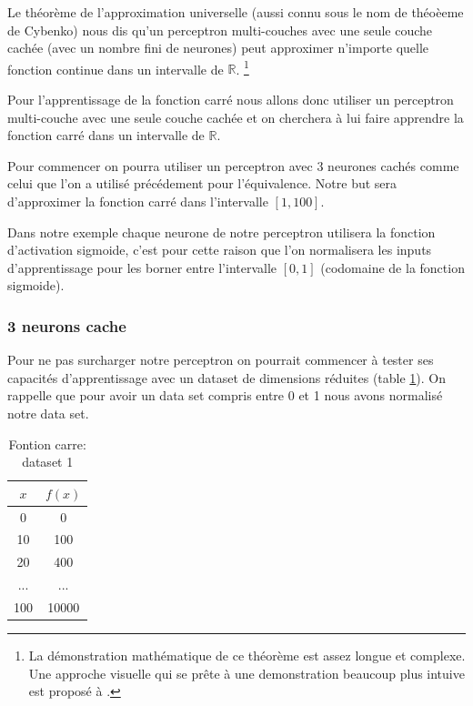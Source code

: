 \documentclass[twoside,openright,a4paper,11pt,french]{article}
\begin{document}
Le théorème de l'approximation universelle (aussi connu sous le nom de théoèeme de Cybenko) 
nous dis qu'un perceptron multi-couches avec une seule couche cachée (avec un nombre
fini de neurones) peut approximer n'importe quelle fonction continue dans un 
intervalle de $\mathbb{R}$.
\footnote{
La démonstration mathématique de ce théorème est assez longue et complexe. Une approche visuelle
qui se prête à une demonstration beaucoup plus intuive est proposé à \cite{visuniprof}.
}
\cite{cybthm}

Pour l'apprentissage de la fonction carré nous allons donc utiliser un perceptron
multi-couche avec une seule couche cachée et on cherchera à lui faire apprendre
la fonction carré dans un intervalle de $\mathbb{R}$.

Pour commencer on pourra utiliser un perceptron avec 3 neurones cachés comme
celui que l'on a utilisé précédement pour l'équivalence. Notre but sera
d'approximer la fonction carré dans l'intervalle $[1,100]$.

Dans notre exemple chaque neurone de notre perceptron utilisera la fonction
d'activation sigmoide, c'est pour cette raison que l'on normalisera les inputs
d'apprentissage pour les borner entre l'intervalle $[0,1]$ (codomaine de la
fonction sigmoide).

\subsubsection{3 neurons cache}

Pour ne pas surcharger notre  perceptron on pourrait commencer à tester
ses capacités d'apprentissage avec un dataset de dimensions réduites (table
\ref{tab:fqt1}). On rappelle que pour avoir un data set compris entre 0 et 1
nous avons normalisé notre data set.

\begin{table}[h]
  \centering
  \begin{tabular}{| c | c |}
    \hline
    \textbf{$x$} & \textbf{$f(x)$}\\
    \hline
    0 & 0 \\
    \hline
    10 & 100 \\
    \hline
    20 & 400 \\
    \hline
    ... & ... \\
    \hline
    100 & 10000 \\
    \hline
  \end{tabular}
  \caption{Fontion carre: dataset 1}
  \label{tab:fqt1}
\end{table}
\end{document}
